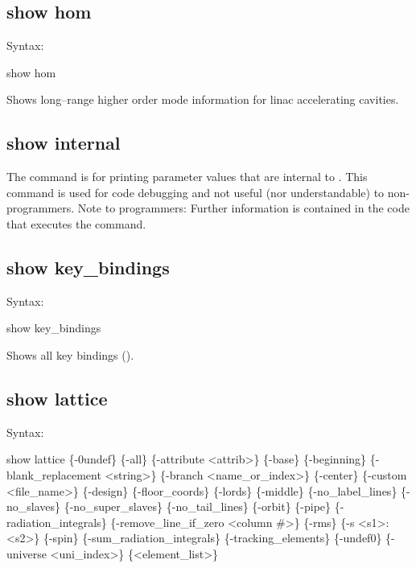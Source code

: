 {{{{{{{{{\subsection{show hom}
\label{s:show.hom}

Syntax:
\begin{example}
  show hom
\end{example}

Shows long--range higher order mode information for linac accelerating
cavities.


\subsection{show internal}
\label{s:show.internal}

The  command is for printing parameter values that are internal to \tao. This
command is used for code debugging and not useful (nor understandable) to non-programmers. Note to
programmers: Further information is contained in the code that executes the 
command.


\subsection{show key_bindings}
\label{s:show.key}

Syntax:
\begin{example}
  show key_bindings
\end{example}

Shows all key bindings ().


\subsection{show lattice}
\label{s:show.lattice}

Syntax:
\begin{example}
  show lattice \{-0undef\} \{-all\} \{-attribute <attrib>\} \{-base\} \{-beginning\}
      \{-blank_replacement <string>\}  \{-branch <name_or_index>\} \{-center\}
      \{-custom <file_name>\} \{-design\} \{-floor_coords\} \{-lords\} \{-middle\}
      \{-no_label_lines\} \{-no_slaves\} \{-no_super_slaves\} \{-no_tail_lines\} \{-orbit\} 
      \{-pipe\} \{-radiation_integrals\} \{-remove_line_if_zero <column \#>\} 
      \{-rms\} \{-s <s1>:<s2>\} \{-spin\} \{-sum_radiation_integrals\} \{-tracking_elements\} 
      \{-undef0\} \{-universe <uni_index>\} \{<element_list>\} 
\end{example}

}}}}}}}}}
